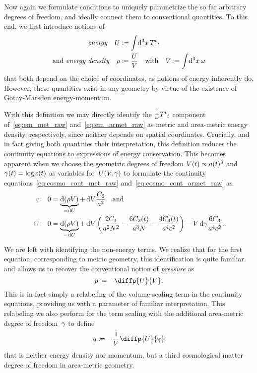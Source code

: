 Now again we formulate conditions to uniquely parametrize the so far arbitrary degrees of freedom, and ideally connect them to conventional quantities. To this end, we first introduce notions of
\begin{align}
	\text{\emph{energy}} \quad \internen&\defeq\intd{^3\coordx}{\EMt^t}_t\\
	\text{and \emph{energy density}} \quad \dens&\defeq\frac{\internen}{\vol} \quad \text{with} \quad \vol\defeq\intd{^3\coordx}\volel
\end{align}
that both depend on the choice of coordinates, as notions of energy inherently do. However, these quantities exist in any geometry by virtue of the existence of Gotay-Marsden energy-momentum.

With this definition we may directly identify the $\frac{1}{\omega}{T^t}_t$ component of~\eqref{eq:em_met_raw} and~\eqref{eq:em_armet_raw} as metric and area-metric energy density, respectively, since neither depends on spatial coordinates. Crucially, and in fact giving both quantities their interpretation, this definition reduces the continuity equations to expressions of energy conservation. This becomes apparent when we choose the geometric degrees of freedom ${V(t)\propto a(t)^3}$ and ${\gamma(t)=\log{c(t)}}$ as variables for~$U(V,\gamma)$ to formulate the continuity equations~\eqref{eq:cosmo_cont_met_raw} and~\eqref{eq:cosmo_cont_armet_raw} as
\begin{align}
	\metind 0&=\underbrace{
		\dif{\left(\dens\vol\right)}
	}_{
		=\dif{\internen}
	}+\dif{\vol}\frac{\Const_2}{\scalea^2} \quad \text{and} \label{eq:cosmo_cont_met_withdens}\\
	\armetind 0&=\underbrace{
		\dif{\left(\dens\vol\right)}
	}_{
		=\dif{\internen}
	}+\dif{\vol}\left(\frac{2\Const_1}{\scalea^2\Nlapse^2}-\frac{6\Const_2\oft}{\scalea^3\Nlapse}-\frac{4\Const_3\oft}{\scalea^4\scalec^2}\right)-\vol\dif{\lnc}\frac{6\Const_3}{\scalea^4\scalec^2}\label{eq:cosmo_cont_armet_withdens}
	\eqpunct{.}
\end{align}


We are left with identifying the non-energy terms. We realize that for the first equation, corresponding to metric geometry, this identification is quite familiar and allows us to recover the conventional notion of \emph{pressure} as
\begin{equation}
	\press\defeq-\diffp{\internen}{\vol}
	\eqpunct{.}
\end{equation}
This is in fact simply a relabeling of the volume-scaling term in the continuity equations, providing us with a parameter of familiar interpretation. This relabeling we also perform for the term scaling with the additional area-metric degree of freedom~$\gamma$ to define
\begin{equation}\label{eq:q_def}
	\q\defeq-\frac{1}{\vol}\diffp{\internen}{\lnc}
\end{equation}
that is neither energy density nor momentum, but a third cosmological matter degree of freedom in area-metric geometry.

